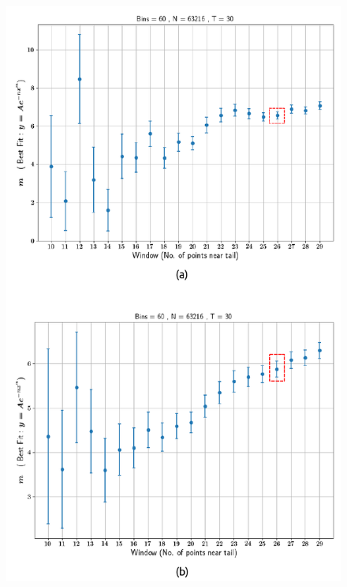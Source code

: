 \begin{figure}
\centering
	\includegraphics{plots/drop_stats/determine_fit_linear.pdf}
	\caption{\blindtext}
\label{determine_linear}
\end{figure}



